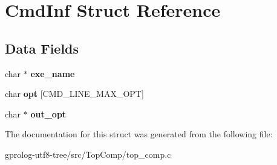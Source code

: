 \hypertarget{structCmdInf}{}\section{Cmd\+Inf Struct Reference}
\label{structCmdInf}
\subsection*{Data Fields}
\begin{DoxyCompactItemize}
\item 
char $\ast$ {\bfseries exe\+\_\+name}\hypertarget{structCmdInf_a08f467c4c99d5989d79d571d71eb91cc}{}\label{structCmdInf_a08f467c4c99d5989d79d571d71eb91cc}

\item 
char {\bfseries opt} \mbox{[}C\+M\+D\+\_\+\+L\+I\+N\+E\+\_\+\+M\+A\+X\+\_\+\+O\+PT\mbox{]}\hypertarget{structCmdInf_ad3011b5eb07e4f6bc735ba74f0061fb5}{}\label{structCmdInf_ad3011b5eb07e4f6bc735ba74f0061fb5}

\item 
char $\ast$ {\bfseries out\+\_\+opt}\hypertarget{structCmdInf_a8810930cb97bd994d3d5a081222e9882}{}\label{structCmdInf_a8810930cb97bd994d3d5a081222e9882}

\end{DoxyCompactItemize}


The documentation for this struct was generated from the following file\+:\begin{DoxyCompactItemize}
\item 
gprolog-\/utf8-\/tree/src/\+Top\+Comp/top\+\_\+comp.\+c\end{DoxyCompactItemize}
